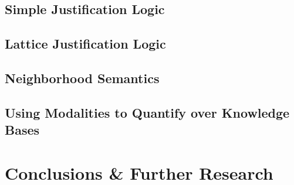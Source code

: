 \documentclass[draft]{article}
\begin{document}
\subsection{Simple Justification Logic}
\label{simple_justification}


\subsection{Lattice Justification Logic}
\label{lattice_justification}


\subsection{Neighborhood Semantics}
\label{neighborhood_semantics}


\subsection{\label{quantifying}Using Modalities to Quantify over Knowledge
Bases}
\label{modal-modal}


\section{Conclusions \& Further Research}
\label{conclusions}




\end{document}

